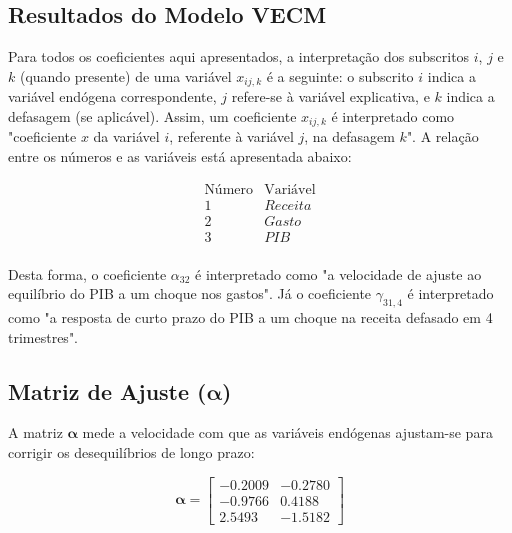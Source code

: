 \documentclass[a4paper, 12pt, openany, oneside, brazil]{abntex2}
\begin{document}


\postextual



\begin{apendicesenv}
%
\partapendices

\chapter{Resultados do Modelo VECM}

Para todos os coeficientes aqui apresentados, a interpretação dos subscritos $i$, $j$ e $k$ (quando presente) de uma variável $x_{ij,k}$ é a seguinte: o subscrito $i$ indica a variável endógena correspondente, $j$ refere-se à variável explicativa, e $k$ indica a defasagem (se aplicável). Assim, um coeficiente $x_{ij,k}$ é interpretado como "coeficiente $x$ da variável $i$, referente à variável $j$, na defasagem $k$". A relação entre os números e as variáveis está apresentada abaixo:

\[
	\begin{array}{c|c}
		\text{Número} & \text{Variável} \\
		\hline
		1 & Receita \\ 
		2 & Gasto \\
		3 & PIB \\
	\end{array}
\]

Desta forma, o coeficiente $\alpha_{32}$ é interpretado como "a velocidade de ajuste ao equilíbrio do PIB a um choque nos gastos". Já o coeficiente $\gamma_{31,4}$ é interpretado como "a resposta de curto prazo do PIB a um choque na receita defasado em 4 trimestres".


\section{Matriz de Ajuste ($\mathbf{\alpha}$)}
A matriz $\mathbf{\alpha}$ mede a velocidade com que as variáveis endógenas ajustam-se para corrigir os desequilíbrios de longo prazo:

\[
	\mathbf{\alpha} =
	\begin{bmatrix}
		-0.2009 & -0.2780 \\
		-0.9766 &  0.4188 \\
		2.5493 & -1.5182
	\end{bmatrix}
\]


\end{apendicesenv}
\end{document}
